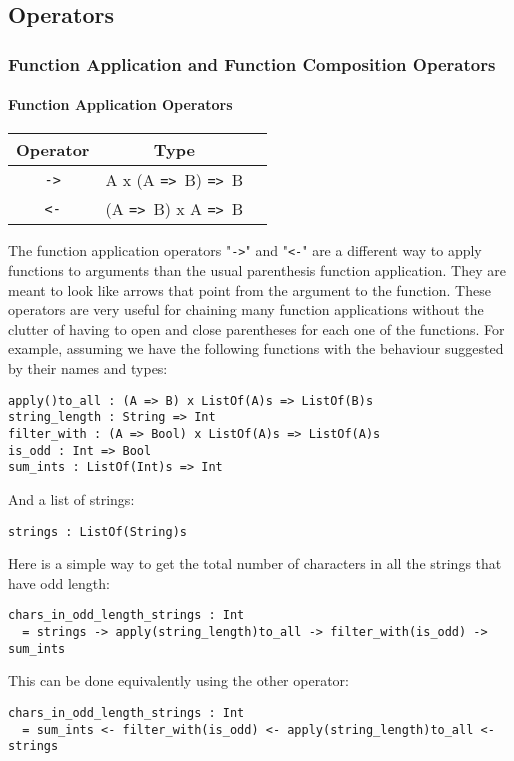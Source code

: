 \documentclass{article}
\def\ra{\texttt{=>}\ }
\begin{document}
\subsection{Operators}

\subsubsection{Function Application and Function Composition Operators}

\paragraph{Function Application Operators}

\begin{center}
\begin{tabular}{ |c|c|c| } 
\hline
Operator & Type \\ 
\hline
\hline
\texttt{->} & A x (A \ra B) \ra B \\
\hline
\texttt{<-} & (A \ra B) x A \ra B \\
\hline
\end{tabular}
\end{center}
The function application operators "\texttt{->}" and "\texttt{<-}" are a
different way to apply functions to arguments than the usual parenthesis
function application.  They are meant to look like arrows that point from the
argument to the function.  These operators are very useful for chaining many
function applications without the clutter of having to open and close
parentheses for each one of the functions.  For example, assuming we have the
following functions with the behaviour suggested by their names and types:
\begin{verbatim}
apply()to_all : (A => B) x ListOf(A)s => ListOf(B)s
string_length : String => Int
filter_with : (A => Bool) x ListOf(A)s => ListOf(A)s
is_odd : Int => Bool
sum_ints : ListOf(Int)s => Int
\end{verbatim}
And a list of strings:
\begin{verbatim}
strings : ListOf(String)s
\end{verbatim}
Here is a simple way to get the total number of characters in all the strings
that have odd length:
\begin{verbatim}
chars_in_odd_length_strings : Int
  = strings -> apply(string_length)to_all -> filter_with(is_odd) -> sum_ints
\end{verbatim}
This can be done equivalently using the other operator:
\begin{verbatim}
chars_in_odd_length_strings : Int
  = sum_ints <- filter_with(is_odd) <- apply(string_length)to_all <- strings

\end{verbatim}
\end{document}
